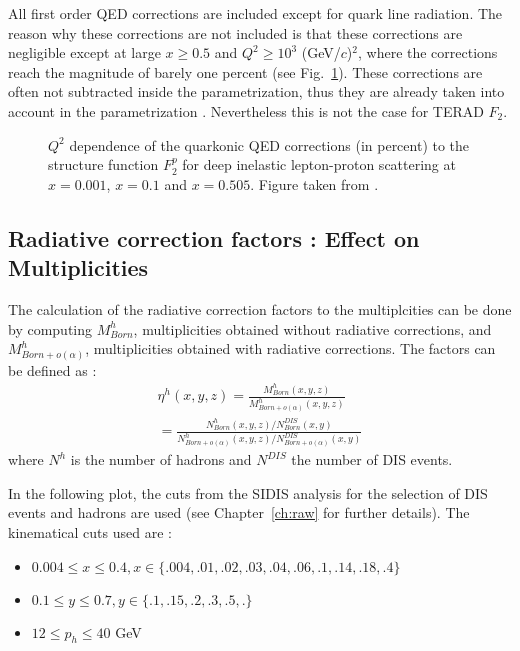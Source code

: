 All first order QED corrections are included except for quark line radiation. The reason why these corrections are not included is that these corrections are negligible except at large $x \geq 0.5$ and $Q^{2} \geq 10^3$ (GeV/$c$)$^2$, where the corrections reach the magnitude of barely one percent (see Fig.~\ref{fig:quarkline}). These corrections are often not subtracted inside the parametrization, thus they are already taken into account in the parametrization \cite{HubertF2Rad}. Nevertheless this is not the case for TERAD $F_2$.

\begin{figure}[htb]
\centerline{}
\caption{$Q^2$ dependence of the quarkonic QED corrections (in percent) to the structure function $F^p_2$ for deep inelastic
lepton-proton scattering at $x=0.001$, $x=0.1$ and $x=0.505$. Figure taken from \cite{HubertF2Rad}.}\label{fig:quarkline}
\end{figure}

\subsection{Radiative correction factors : Effect on Multiplicities}\label{sec:RCFMult}

The calculation of the radiative correction factors to the multiplcities can be done by computing
$M^{h}_{Born}$, multiplicities obtained without radiative corrections, and $M^{h}_{Born+o(\alpha)}$,
multiplicities obtained with radiative corrections. The factors can be defined as :
%
\begin{equation}
  \begin{split}
    \eta^{h}(x,y,z)=\frac{M^{h}_{Born}(x,y,z)}{M^{h}_{Born+o(\alpha)}(x,y,z)} \\
     = \frac{N^{h}_{Born}(x,y,z)/N^{DIS}_{Born}(x,y)}{N^{h}_{Born+o(\alpha)}(x,y,z)/N^{DIS}_{Born+o(\alpha)}(x,y)}
  \end{split}
\end{equation}
%
where $N^h$ is the number of hadrons and $N^{DIS}$ the number of DIS events.


In the following plot, the cuts from the SIDIS analysis for the selection of DIS events and hadrons are used (see Chapter~\ref{ch:raw} for further details). The kinematical cuts used are :

\begin{itemize}
\item $0.004 \leq x \leq 0.4, x \in \{.004,.01,.02,.03,.04,.06,.1,.14,.18,.4\}$
\item $0.1 \leq y \leq 0.7, y \in \{.1,.15,.2,.3,.5,.\}$
\item $12 \leq p_h \leq 40$ GeV
\end{itemize}

